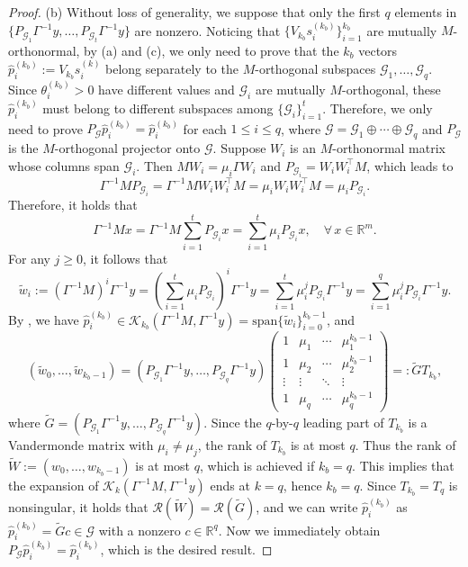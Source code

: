 \documentclass[]{myarticle}
\newcommand\calG{\mathcal{G}}
\newcommand\calR{\mathcal{R}}
\begin{document}
\begin{proof}
  (b) Without loss of generality, we suppose that only the first $q$ elements in $\{P_{\mathcal{G}_1}\Gamma^{-1}y,\dots,P_{\mathcal{G}_t}\Gamma^{-1}y\}$ are nonzero. Noticing that $\{V_{k_b}s_{i}^{(k_b)}\}_{i=1}^{k_b}$ are mutually $M$-orthonormal, by  (a) and (c), we only need to prove that the $k_b$ vectors $\hat{p}_{i}^{(k_b)}:=V_{k_b}s_{i}^{(k)}$ belong separately to the $M$-orthogonal subspaces $\mathcal{G}_{1},\dots,\mathcal{G}_q$. Since $\theta_{i}^{(k_b)}>0$ have different values and $\calG_i$ are mutually $M$-orthogonal, these $\hat{p}_{i}^{(k_b)}$ must belong to different subspaces among $\{\mathcal{G}_i\}_{i=1}^{t}$. Therefore, we only need to prove $P_{\calG}\hat{p}_{i}^{(k_b)}=\hat{p}_{i}^{(k_b)}$ for each $1\leq i\leq q$, where $\calG=\calG_1\oplus\cdots\oplus\calG_q$ and $P_{\calG}$ is the $M$-orthogonal projector onto $\calG$. Suppose $W_i$ is an $M$-orthonormal matrix whose columns span $\mathcal{G}_i$. Then $MW_i=\mu_{i}\Gamma W_i$ and $P_{\mathcal{G}_i}=W_{i}W_{i}^{\top}M$, which leads to 
  \[\Gamma^{-1}MP_{\mathcal{G}_i}=\Gamma^{-1}MW_{i}W_{i}^{\top}M=\mu_i W_{i}W_{i}^{\top}M=\mu_iP_{\mathcal{G}_i}.\] 
  Therefore, it holds that 
  \[\Gamma^{-1}Mx 
    = \Gamma^{-1}M\sum_{i=1}^{t}P_{\mathcal{G}_i}x
    = \sum_{i=1}^{t}\mu_{i}P_{\mathcal{G}_i}x, \quad  \forall \, x\in\mathbb{R}^{m} .\]
  For any $j\geq 0$, it follows that 
  \begin{equation*}
    \widetilde{w}_i:=(\Gamma^{-1}M)^{i}\Gamma^{-1}y = \left(\sum_{i=1}^{t}\mu_{i}P_{\mathcal{G}_i} \right)^i \Gamma^{-1}y
    = \sum_{i=1}^{t}\mu_{i}^{j}P_{\mathcal{G}_i}\Gamma^{-1}y
    = \sum_{i=1}^{q}\mu_{i}^{j}P_{\mathcal{G}_i}\Gamma^{-1}y .
  \end{equation*}
  By , we have $\hat{p}_{i}^{(k_b)}\in\mathcal{K}_{k_b}(\Gamma^{-1}M,\Gamma^{-1}y)=\mathrm{span}\{\widetilde{w}_i\}_{i=0}^{k_b-1}$, and
	\begin{equation*}
		(\widetilde{w}_{0},\dots,\widetilde{w}_{k_b-1}) = (P_{\mathcal{G}_1}\Gamma^{-1}y, \dots, P_{\mathcal{G}_q}\Gamma^{-1}y)
		\begin{pmatrix}
			1 & \mu_{1} & \cdots & \mu_{1}^{k_b-1} \\
			1 & \mu_{2} & \cdots & \mu_{2}^{k_b-1} \\
			\vdots & \vdots & \ddots & \vdots \\
			1 & \mu_{q} & \cdots & \mu_{q}^{k_b-1}
			\end{pmatrix} =: \widetilde{G}T_{k_b},
	\end{equation*} 
	where $\widetilde{G}=(P_{\mathcal{G}_1}\Gamma^{-1}y, \dots, P_{\mathcal{G}_q}\Gamma^{-1}y)$. Since the $q$-by-$q$ leading part of $T_{k_b}$ is a Vandermonde matrix with $\mu_i\neq\mu_j$, the rank of $T_{k_b}$ is at most $q$. Thus the rank of $\widetilde{W}:=(w_{0},\dots,w_{k_b-1})$ is at most $q$, which is achieved if $k_b=q$. This implies that the expansion of $\mathcal K_{k}(\Gamma^{-1}M,\Gamma^{-1}y)$ ends at $k=q$, hence $k_b =q$. Since $T_{k_b}=T_{q}$ is nonsingular, it holds that $\calR(\widetilde{W})=\calR(\widetilde{G})$, and we can write $\hat{p}_{i}^{(k_b)}$ as $\hat{p}_{i}^{(k_b)}=\widetilde{G}c\in\calG$ with a nonzero $c\in\mathbb{R}^{q}$. Now we immediately obtain $P_{\calG}\hat{p}_{i}^{(k_b)}=\hat{p}_{i}^{(k_b)}$, which is the desired result.

\end{proof}
\end{document}
